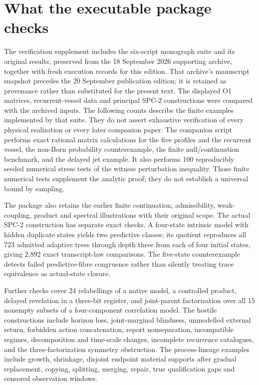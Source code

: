 \section{What the executable package checks}\label{section:matrices:what-the-executable-package-checks}
The verification supplement includes the six-script monograph suite and its original results, preserved from the 18 September 2026 supporting archive, together with fresh execution records for this edition. That archive's manuscript snapshot precedes the 20 September publication edition; it is retained as provenance rather than substituted for the present text. The displayed O1 matrices, recurrent-vessel data and principal SPC-2 constructions were compared with the archived inputs. The following counts describe the finite examples implemented by that suite. They do not assert exhaustive verification of every physical realization or every later companion paper.
The companion script performs exact rational matrix calculations for the five profiles and the recurrent vessel, the non-Born probability counterexample, the finite null/continuation benchmark, and the delayed jet example. It also performs 100 reproducibly seeded numerical stress tests of the witness perturbation inequality. Those finite numerical tests supplement the analytic proof; they do not establish a universal bound by sampling.

The package also retains the earlier finite continuation, admissibility, weak-coupling, product and spectral illustrations with their original scope. The actual SPC-2 construction has separate exact checks. A four-state intrinsic model with hidden duplicate states yields two predictive classes; its quotient reproduces all 723 admitted adaptive trees through depth three from each of four initial states, giving 2,892 exact transcript-law comparisons. The five-state counterexample detects failed predictive-fibre congruence rather than silently treating trace equivalence as actual-state closure.

Further checks cover 24 relabellings of a native model, a controlled product, delayed revelation in a three-bit register, and joint-parent factorization over all 15 nonempty subsets of a four-component correlation model. The hostile constructions include horizon loss, joint-marginal blindness, unmodelled external return, forbidden action concatenation, report nonseparation, incompatible regimes, decomposition and time-scale changes, incomplete recurrence catalogues, and the three-factorization symmetry obstruction. The process-lineage examples include growth, shrinkage, disjoint endpoint material supports after gradual replacement, copying, splitting, merging, repair, true qualification gaps and censored observation windows.

